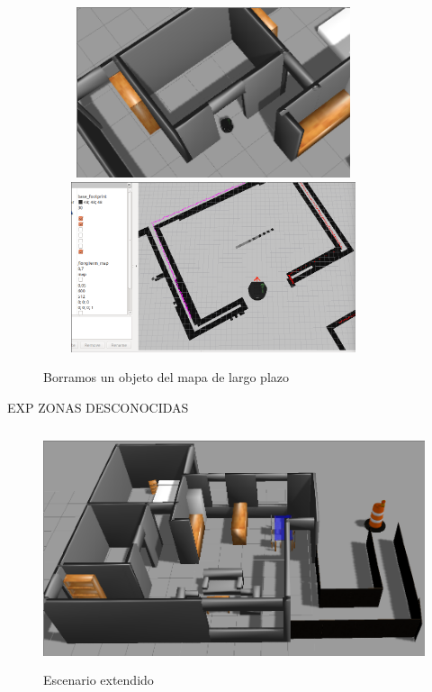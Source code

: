 \begin{figure}[H]
  \begin{center}
    \includegraphics[width=10cm,height=5cm]{img/cap7/deletingobject-gazebo}
    \includegraphics[width=10cm,height=5cm]{img/cap7/deletingobject-longmap}
  \end{center}
  \caption{Borramos un objeto del mapa de largo plazo}
  \label{fig:deleteobjectlongmap}
\end{figure}


EXP ZONAS DESCONOCIDAS


\begin{figure}[hbtp]
  \begin{center}
    \includegraphics[width=12cm,height=7cm]{img/cap7/grannieAnne-ext}
  \end{center}
  \caption{Escenario extendido}
  \label{fig:grannieAnne-ext}
\end{figure}


